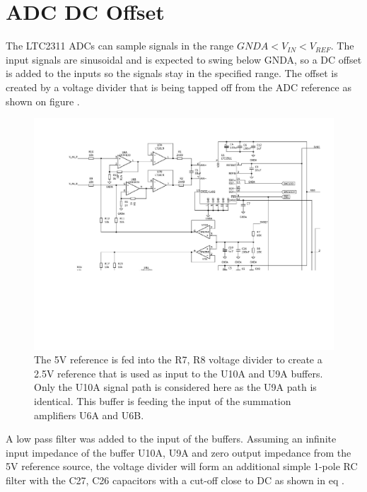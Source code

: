 \section{ADC DC Offset} \label{subsec:ADCDCOffset}
The LTC2311 ADCs can sample signals in the range $GNDA < V_{IN} < V_{REF}$. The input signals are sinusoidal and is expected to swing below GNDA, so a  DC offset is added to the inputs so the signals stay in the specified range. The  offset is created by a voltage divider that is being tapped off from the  ADC reference as shown on figure .

\begin{figure}[H]
    \centering
    \includegraphics[clip, trim=0 200 0 0, width=1\textwidth]{Sections/7_SystemDesign/Figures/7_1_3_DCOFFSET.pdf}
    \caption{The 5V reference is fed into the R7, R8 voltage divider to create a 2.5V reference that is used as input to the U10A and U9A buffers. Only the U10A signal path is considered here as the U9A path is identical. This buffer is feeding the input of the summation amplifiers U6A and U6B.}
    \label{fig_7_1_3_ADC2.5VOFFSET}
\end{figure}

A low pass filter was added to the input of the buffers. Assuming an infinite input impedance of the buffer U10A, U9A and zero output impedance from the 5V reference source, the voltage divider will form an additional simple 1-pole RC filter with the C27, C26 capacitors with a cut-off close to DC as shown in eq .

